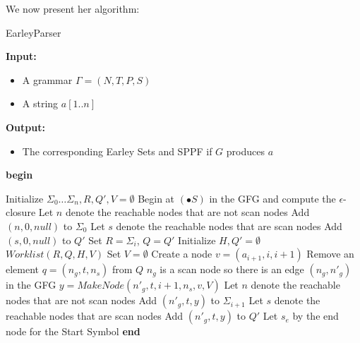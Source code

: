 \documentclass{sigplanconf}
\begin{document}
We now present her algorithm:
\begin{algorithm}[!h]\label{alg:EP}
	\caption{EarleyParser}
	\textbf{Input:} 
	\begin{itemize}
	\item[] A grammar $\Gamma = (N,T,P,S)$
	\item[] A string $a[1..n]$
	\end{itemize}
	\textbf{Output:} 
	\begin{itemize}
	\item[] The corresponding Earley Sets and SPPF if $G$ produces $a$
	\end{itemize}
	\textbf{begin}
	
	Initialize $\Sigma_0\dots{\Sigma_n}, R, Q', V = \emptyset$ \;
	Begin at $(\bullet{S})$ in the GFG and compute the $\epsilon$-closure \;
	\quad Let $n$ denote the reachable nodes that are not scan nodes \; 
	\quad Add $(n,0,null)$ to $\Sigma_0$ \;
	\quad Let $s$ denote the reachable nodes that are scan nodes \; 
	\quad Add $(s,0,null)$ to $Q'$ \;
	{
	Set $R=\Sigma_i$, $Q=Q'$ \;
	Initialize $H,Q'=\emptyset$ \;
	$Worklist(R,Q,H,V)$ \;
	Set $V=\emptyset$ \;
	Create a node $v=(a_{i+1},i,i+1)$ \;
	{
	Remove an element $q=(n_g,t,n_s)$ from $Q$ \;
	$n_g$ is a scan node so there is an edge $(n_g,n'_g)$ in the GFG \;
    $y=MakeNode(n'_g,t,i+1,n_s,v,V)$ \;
    Let $n$ denote the reachable nodes that are not scan nodes \;
    Add $(n'_g,t,y)$ to $\Sigma_{i+1}$ \;
    Let $s$ denote the reachable nodes that are scan nodes \;
    Add $(n'_g,t,y)$ to $Q'$ \;
    }
    }
    Let $s_e$ by the end node for the Start Symbol \;
    \textbf{end}
\end{algorithm}
\end{document}
